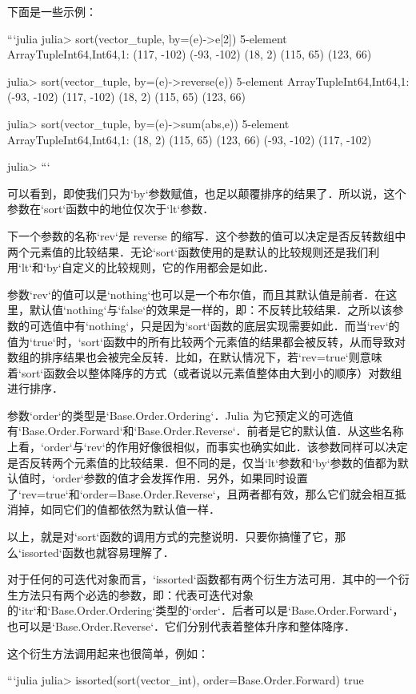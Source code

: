 下面是一些示例：

```julia
julia> sort(vector_tuple, by=(e)->e[2])
5-element Array{Tuple{Int64,Int64},1}:
 (117, -102)
 (-93, -102)
 (18, 2)    
 (115, 65)  
 (123, 66)  

julia> sort(vector_tuple, by=(e)->reverse(e))
5-element Array{Tuple{Int64,Int64},1}:
 (-93, -102)
 (117, -102)
 (18, 2)    
 (115, 65)  
 (123, 66)  

julia> sort(vector_tuple, by=(e)->sum(abs,e))
5-element Array{Tuple{Int64,Int64},1}:
 (18, 2)    
 (115, 65)  
 (123, 66)  
 (-93, -102)
 (117, -102)

julia> 
```

可以看到，即使我们只为`by`参数赋值，也足以颠覆排序的结果了．所以说，这个参数在`sort`函数中的地位仅次于`lt`参数．

下一个参数的名称`rev`是 reverse 的缩写．这个参数的值可以决定是否反转数组中两个元素值的比较结果．无论`sort`函数使用的是默认的比较规则还是我们利用`lt`和`by`自定义的比较规则，它的作用都会是如此．

参数`rev`的值可以是`nothing`也可以是一个布尔值，而且其默认值是前者．在这里，默认值`nothing`与`false`的效果是一样的，即：不反转比较结果．之所以该参数的可选值中有`nothing`，只是因为`sort`函数的底层实现需要如此．而当`rev`的值为`true`时，`sort`函数中的所有比较两个元素值的结果都会被反转，从而导致对数组的排序结果也会被完全反转．比如，在默认情况下，若`rev=true`则意味着`sort`函数会以整体降序的方式（或者说以元素值整体由大到小的顺序）对数组进行排序．

参数`order`的类型是`Base.Order.Ordering`．Julia 为它预定义的可选值有`Base.Order.Forward`和`Base.Order.Reverse`．前者是它的默认值．从这些名称上看，`order`与`rev`的作用好像很相似，而事实也确实如此．该参数同样可以决定是否反转两个元素值的比较结果．但不同的是，仅当`lt`参数和`by`参数的值都为默认值时，`order`参数的值才会发挥作用．另外，如果同时设置了`rev=true`和`order=Base.Order.Reverse`，且两者都有效，那么它们就会相互抵消掉，如同它们的值都依然为默认值一样．

以上，就是对`sort`函数的调用方式的完整说明．只要你搞懂了它，那么`issorted`函数也就容易理解了．

对于任何的可迭代对象而言，`issorted`函数都有两个衍生方法可用．其中的一个衍生方法只有两个必选的参数，即：代表可迭代对象的`itr`和`Base.Order.Ordering`类型的`order`．后者可以是`Base.Order.Forward`，也可以是`Base.Order.Reverse`．它们分别代表着整体升序和整体降序．

这个衍生方法调用起来也很简单，例如：

```julia
julia> issorted(sort(vector_int), order=Base.Order.Forward)
true

